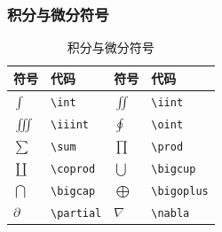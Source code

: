 \documentclass{article}
\begin{document}
\subsubsection{积分与微分符号}
\begin{table}[H]
      \centering
      \begin{tabular}{>{\centering\arraybackslash}p{2cm}>{\centering\arraybackslash}p{3cm}>{\centering\arraybackslash}p{2cm}>{\centering\arraybackslash}p{3cm}}
            \toprule
            \textbf{符号} & \textbf{代码}     & \textbf{符号} & \textbf{代码}      \\
            \midrule
            $\int$      & \verb|\int|     & $\iint$     & \verb|\iint|     \\
            $\iiint$    & \verb|\iiint|   & $\oint$     & \verb|\oint|     \\
            $\sum$      & \verb|\sum|     & $\prod$     & \verb|\prod|     \\
            $\coprod$   & \verb|\coprod|  & $\bigcup$   & \verb|\bigcup|   \\
            $\bigcap$   & \verb|\bigcap|  & $\bigoplus$ & \verb|\bigoplus| \\
            $\partial$  & \verb|\partial| & $\nabla$    & \verb|\nabla|    \\
            \bottomrule
      \end{tabular}
      \caption{积分与微分符号}
\end{table}
\end{document}
